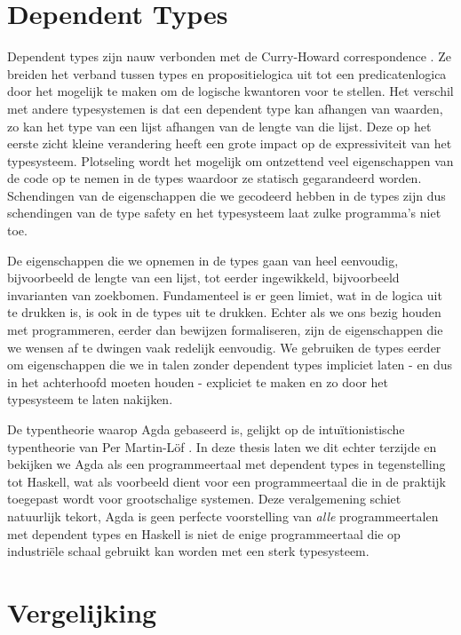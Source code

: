 \section{Dependent Types}

Dependent types zijn nauw verbonden met de Curry-Howard correspondence
\cite{curryhow}. Ze breiden het verband tussen types en propositielogica uit tot
een predicatenlogica door het mogelijk te maken om de logische kwantoren voor
te stellen. Het verschil met andere typesystemen is dat een dependent type kan
afhangen van waarden, zo kan het type van een lijst afhangen van de lengte van
die lijst. Deze op het eerste zicht kleine verandering heeft een grote impact
op de expressiviteit van het typesysteem. Plotseling wordt het mogelijk om
ontzettend veel eigenschappen van de code op te nemen in de types waardoor ze
statisch gegarandeerd worden. Schendingen van de eigenschappen die we gecodeerd
hebben in de types zijn dus schendingen van de type safety en het typesysteem
laat zulke programma's niet toe.

De eigenschappen die we opnemen in de types gaan van heel eenvoudig,
bijvoorbeeld de lengte van een lijst, tot eerder ingewikkeld, bijvoorbeeld
invarianten van zoekbomen. Fundamenteel is er geen limiet, wat in de logica uit
te drukken is, is ook in de types uit te drukken. Echter als we ons bezig
houden met programmeren, eerder dan bewijzen formaliseren, zijn de
eigenschappen die we wensen af te dwingen vaak redelijk eenvoudig. We gebruiken
de types eerder om eigenschappen die we in talen zonder dependent types
impliciet laten - en dus in het achterhoofd moeten houden - expliciet te maken
en zo door het typesysteem te laten nakijken.

De typentheorie waarop Agda gebaseerd is, gelijkt op de intuïtionistische
typentheorie van Per Martin-Löf \cite{martinlof}. In deze thesis laten we dit
echter terzijde en bekijken we Agda als een programmeertaal met dependent types
in tegenstelling tot Haskell, wat als voorbeeld dient voor een programmeertaal
die in de praktijk toegepast wordt voor grootschalige systemen. Deze
veralgemening schiet natuurlijk tekort, Agda is geen perfecte voorstelling van
\emph{alle} programmeertalen met dependent types en Haskell is niet de enige
programmeertaal die op industriële schaal gebruikt kan worden met een sterk
typesysteem.


\section{Vergelijking}

